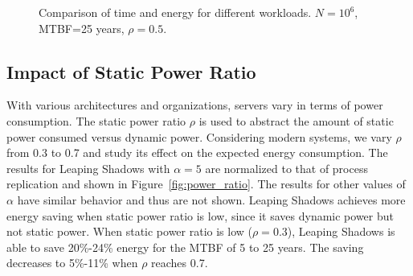 \begin{figure}[!h]
	\begin{center}
	\end{center}
	\caption{Comparison of time and energy for different workloads. $N=10^6$, MTBF=25 years, $\rho=0.5$.}
	\label{fig:w25}
    \vspace{-0.5in}
\end{figure}

\subsection{Impact of Static Power Ratio}
\label{eval_static_power}
With various architectures and organizations, servers
vary in terms of
power consumption. The static power ratio $\rho$ is used to abstract the
amount of static power consumed versus dynamic power. 
Considering modern systems, we vary $\rho$ from 0.3 to 0.7 and study its effect
on the expected energy consumption. The results for Leaping Shadows with $\alpha=5$ are normalized to that of process replication and shown in 
Figure~\ref{fig:power_ratio}. The results for other values of $\alpha$ have similar behavior and thus are not shown. Leaping Shadows achieves
more energy saving when static power ratio is low, since it saves dynamic 
power but not static power. When static power ratio is low ($\rho=0.3$), Leaping Shadows
is able to save 20\%-24\% energy for the MTBF of 5 to 25 years. The saving decreases to 5\%-11\% when $\rho$ reaches 0.7. 


